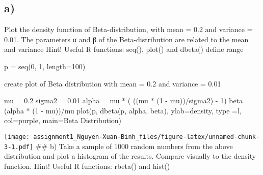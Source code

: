 \documentclass[
]{article}
\newenvironment{Shaded}{\begin{snugshade}}{\end{snugshade}}
\newcommand{\AttributeTok}[1]{\textcolor[rgb]{0.77,0.63,0.00}{#1}}
\newcommand{\DecValTok}[1]{\textcolor[rgb]{0.00,0.00,0.81}{#1}}
\newcommand{\FloatTok}[1]{\textcolor[rgb]{0.00,0.00,0.81}{#1}}
\newcommand{\FunctionTok}[1]{\textcolor[rgb]{0.00,0.00,0.00}{#1}}
\newcommand{\NormalTok}[1]{#1}
\newcommand{\OtherTok}[1]{\textcolor[rgb]{0.56,0.35,0.01}{#1}}
\newcommand{\SpecialCharTok}[1]{\textcolor[rgb]{0.00,0.00,0.00}{#1}}
\newcommand{\StringTok}[1]{\textcolor[rgb]{0.31,0.60,0.02}{#1}}
\begin{document}
\hypertarget{a}{%
\subsection{a)}\label{a}}

Plot the density function of Beta-distribution, with mean = 0.2 and
variance = 0.01. The parameters α and β of the Beta-distribution are
related to the mean and variance Hint! Useful R functions: seq(), plot()
and dbeta() define range

\begin{Shaded}
\begin{Highlighting}[]
\NormalTok{p }\OtherTok{=} \FunctionTok{seq}\NormalTok{(}\DecValTok{0}\NormalTok{, }\DecValTok{1}\NormalTok{, }\AttributeTok{length=}\DecValTok{100}\NormalTok{)}
\end{Highlighting}
\end{Shaded}

create plot of Beta distribution with mean = 0.2 and variance = 0.01

\begin{Shaded}
\begin{Highlighting}[]
\NormalTok{mu }\OtherTok{=} \FloatTok{0.2}
\NormalTok{sigma2 }\OtherTok{=} \FloatTok{0.01}
\NormalTok{alpha }\OtherTok{=}\NormalTok{ mu }\SpecialCharTok{*}\NormalTok{ ( ((mu }\SpecialCharTok{*}\NormalTok{ (}\DecValTok{1} \SpecialCharTok{{-}}\NormalTok{ mu))}\SpecialCharTok{/}\NormalTok{sigma2) }\SpecialCharTok{{-}} \DecValTok{1}\NormalTok{)}
\NormalTok{beta }\OtherTok{=}\NormalTok{ (alpha }\SpecialCharTok{*}\NormalTok{ (}\DecValTok{1} \SpecialCharTok{{-}}\NormalTok{ mu))}\SpecialCharTok{/}\NormalTok{mu}
\FunctionTok{plot}\NormalTok{(p, }\FunctionTok{dbeta}\NormalTok{(p, alpha, beta), }\AttributeTok{ylab=}\StringTok{\textquotesingle{}density\textquotesingle{}}\NormalTok{,}
     \AttributeTok{type =}\StringTok{\textquotesingle{}l\textquotesingle{}}\NormalTok{, }\AttributeTok{col=}\StringTok{\textquotesingle{}purple\textquotesingle{}}\NormalTok{, }\AttributeTok{main=}\StringTok{\textquotesingle{}Beta Distribution\textquotesingle{}}\NormalTok{)}
\end{Highlighting}
\end{Shaded}

\texttt{[image: assignment1\_Nguyen-Xuan-Binh\_files/figure-latex/unnamed-chunk-3-1.pdf]}
\#\# b) Take a sample of 1000 random numbers from the above distribution
and plot a histogram of the results. Compare visually to the density
function. Hint! Useful R functions: rbeta() and hist()
\end{document}

